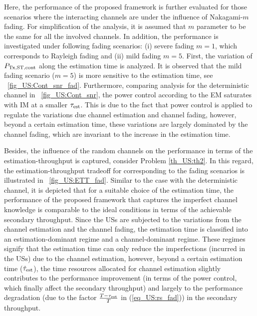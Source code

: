 Here, the performance of the proposed framework is further evaluated for those scenarios where the interacting channels are under the influence of Nakagami-$m$ fading. For simplification of the analysis, it is assumed that $m$ parameter to be the same for all the involved channels. In addition, the performance is investigated under following fading scenarios: (i) severe fading $m=1$, which corresponds to Rayleigh fading
and (ii) mild fading $m = 5$. First, the variation of $P_{\text{Tx,ST,cont}}$ along the estimation time is analyzed. It is observed that the mild fading scenario ($m = 5$) is more sensitive to the estimation time, see \figurename~\ref{fig_US:Cont_snr_fad}. Furthermore, comparing analysis for the deterministic channel in \figurename~\ref{fig_US:Cont_snr}, the power control according to the EM saturates with IM at a smaller $\tau_{\text{est}}$. This is due to the fact that power control is applied to regulate the variations due channel estimation and channel fading, however, beyond a certain estimation time, these variations are largely dominated by the channel fading, which are invariant to the increase in the estimation time. 

Besides, the influence of the random channels on the performance in terms of the estimation-throughput is captured, consider Problem \ref{th_US:th2}. In this regard, the estimation-throughput tradeoff for corresponding to the fading scenarios is illustrated in \figurename~\ref{fig_US:ETT_fad}. Similar to the case with the deterministic channel, it is depicted that for a suitable choice of the estimation time, the performance of the proposed framework that captures the imperfect channel knowledge is comparable to the ideal conditions in terms of the achievable secondary throughput. Since the USs are subjected to the variations from the channel estimation and the channel fading, the estimation time is classified into an estimation-dominant regime and a channel-dominant regime. These regimes signify that the estimation time can only reduce the imperfections (incurred in the USs) due to the channel estimation, however, beyond a certain estimation time ($\tilde{\tau}_{\text{est}}$), the time resources allocated for channel estimation slightly contributes to the performance improvement (in terms of the power control, which finally affect the secondary throughput) and largely to the performance degradation (due to the factor $\frac{T - \tau_{\text{est}}}{T}$ in (\ref{eq_US:rs_fad})) in the secondary throughput. 


